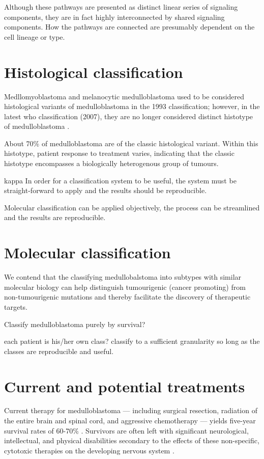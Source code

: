 Although these pathways are presented as distinct linear series of signaling components, they are in fact highly interconnected by shared signaling components. How the pathways are connected are presumably dependent on the cell lineage or type.


\section{Histological classification}

Medllomyoblastoma and melanocytic medulloblastoma used to be considered histological variants of medulloblastoma in the 1993 classification; however, in the latest \gls{who} classification (2007), they are no longer considered distinct histotype of medulloblastoma .

About 70\% of medulloblastoma are of the classic histological variant. Within this histotype, patient response to treatment varies, indicating that the classic histotype encompasses a biologically heterogenous group of tumours.

kappa
In order for a classification system to be useful, the system must be straight-forward to apply and the results should be reproducible.

Molecular classification can be applied objectively, the process can be streamlined and the results are reproducible.


\section{Molecular classification}

We contend that the classifying medullobalstoma into subtypes with similar molecular biology can help distinguish tumourigenic (cancer promoting) from non-tumourigenic mutations and thereby facilitate the discovery of therapeutic targets. 

Classify medulloblastoma purely by survival?

each patient is his/her own class?
classify to a sufficient granularity so long as the classes are reproducible and useful.


\section{Current and potential treatments}

Current therapy for medulloblastoma --- including surgical resection, radiation of the entire brain and spinal cord, and aggressive chemotherapy --- yields five-year survival rates of 60-70\% . Survivors are often left with significant neurological, intellectual, and physical disabilities secondary to the effects of these non-specific, cytotoxic therapies on the developing nervous system .

